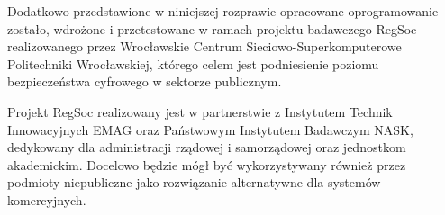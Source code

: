 \bigbreak
Dodatkowo przedstawione w niniejszej rozprawie opracowane oprogramowanie zostało, wdrożone i przetestowane w ramach projektu badawczego RegSoc realizowanego przez Wrocławskie Centrum Sieciowo-Superkomputerowe Politechniki Wrocławskiej, którego celem jest podniesienie poziomu bezpieczeństwa cyfrowego w sektorze publicznym.

\bigbreak
Projekt RegSoc realizowany jest w partnerstwie z Instytutem Technik Innowacyjnych EMAG oraz Państwowym Instytutem Badawczym NASK, dedykowany dla administracji rządowej i samorządowej oraz jednostkom akademickim. Docelowo będzie mógł być wykorzystywany również przez podmioty niepubliczne jako rozwiązanie alternatywne dla systemów komercyjnych.
